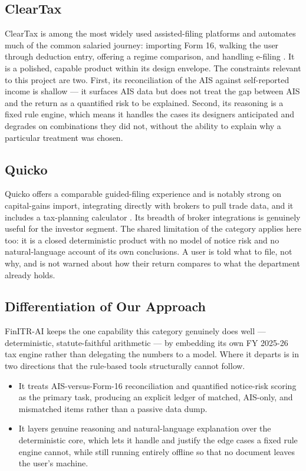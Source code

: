 \documentclass[12pt, a4paper, oneside]{report}
\begin{document}
\subsection{ClearTax}
ClearTax is among the most widely used assisted-filing platforms and automates
much of the common salaried journey: importing Form 16, walking the user through
deduction entry, offering a regime comparison, and handling e-filing
\cite{ref2}. It is a polished, capable product within its design envelope. The
constraints relevant to this project are two. First, its reconciliation of the
AIS against self-reported income is shallow --- it surfaces AIS data but does
not treat the gap between AIS and the return as a quantified risk to be
explained. Second, its reasoning is a fixed rule engine, which means it handles
the cases its designers anticipated and degrades on combinations they did not,
without the ability to explain why a particular treatment was chosen.

\subsection{Quicko}
Quicko offers a comparable guided-filing experience and is notably strong on
capital-gains import, integrating directly with brokers to pull trade data, and
it includes a tax-planning calculator \cite{ref3}. Its breadth of broker
integrations is genuinely useful for the investor segment. The shared limitation
of the category applies here too: it is a closed deterministic product with no
model of notice risk and no natural-language account of its own conclusions. A
user is told what to file, not why, and is not warned about how their return
compares to what the department already holds.

\subsection{Differentiation of Our Approach}
FinITR-AI keeps the one capability this category genuinely does well ---
deterministic, statute-faithful arithmetic --- by embedding its own FY 2025-26
tax engine rather than delegating the numbers to a model. Where it departs is in
two directions that the rule-based tools structurally cannot follow.

\begin{itemize}
    \item It treats AIS-versus-Form-16 reconciliation and quantified notice-risk
          scoring as the primary task, producing an explicit ledger of matched,
          AIS-only, and mismatched items rather than a passive data dump.
    \item It layers genuine reasoning and natural-language explanation over the
          deterministic core, which lets it handle and justify the edge cases a
          fixed rule engine cannot, while still running entirely offline so that
          no document leaves the user's machine.
\end{itemize}
\end{document}
